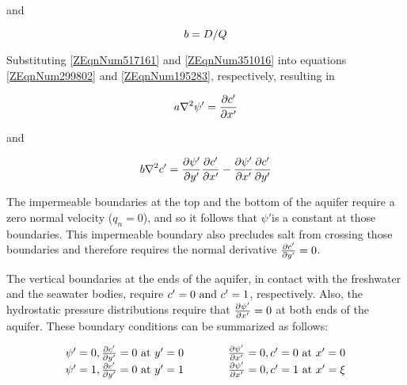and 

\begin{equation} \label{ZEqnNum351016} 
    b={D\mathord{\left/ {\vphantom {D Q}} \right. \kern-\nulldelimiterspace} Q} 
\end{equation}

 Substituting \eqref{ZEqnNum517161} and \eqref{ZEqnNum351016} into equations
 \eqref{ZEqnNum299802} and \eqref{ZEqnNum195283}, respectively, resulting in

\begin{equation} \label{2.19)} 
    a\nabla ^{2} \psi '=\frac{\partial c'}{\partial x'} 
\end{equation}

and

\begin{equation} \label{2.20)} 
    b\nabla ^{2} c'=\frac{\partial \psi'}{\partial y'} \frac{\partial c'}{\partial x'} -\frac{\partial \psi'}{\partial x'} \frac{\partial c'}{\partial y'} 
\end{equation} 

The impermeable boundaries at the top and the bottom of the aquifer require a zero normal velocity
($q_{n} =0$), and so it follows that $\psi '$is a constant at those boundaries. This impermeable
boundary also precludes salt from crossing those boundaries and therefore requires the normal
derivative $\frac{\partial c'}{\partial y'} =0$.

The vertical boundaries at the ends of the aquifer, in contact with the freshwater and the seawater
bodies, require $c'=0\text{ and } c'=1$, respectively.  Also, the hydrostatic pressure distributions
require that $\frac{\partial \psi'}{\partial x'} =0$ at both ends of the aquifer. These boundary conditions can be
summarized as follows:

\begin{equation} \label{BC)} \begin{array}{lcr} 
    \psi ' = 0, \frac{\partial c'}{\partial y'} =0 \text{ at } y'=0
    & \qquad
    & \frac{\partial \psi'}{\partial x'} = 0, c' = 0 \text{ at } x'=0 \\
    \psi '= 1, \frac{\partial c'}{\partial y'} = 0 \text{ at } y'=1
    & \qquad
    & \frac{\partial \psi'}{\partial x'} =0,  c'=1 \text{ at } x'=\xi 
\end{array} \end{equation}

